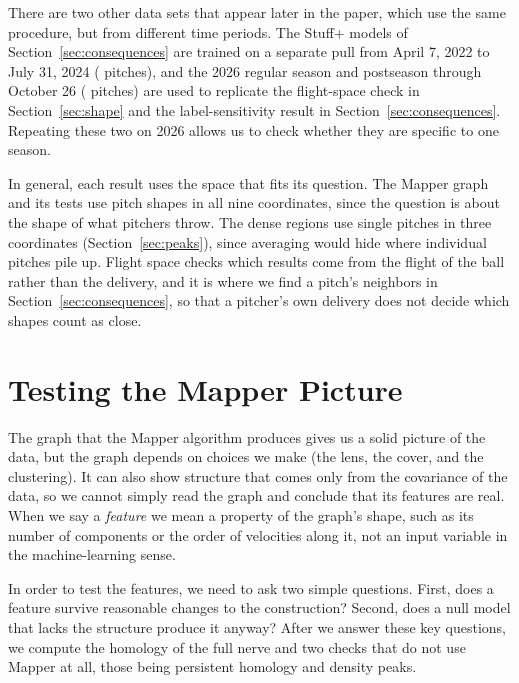 \documentclass[11pt]{article}
\theoremstyle{definition}
\theoremstyle{remark}
\begin{document}
There are two other data sets that appear later in the paper, which use the same procedure, but from different time periods. The Stuff+ models of Section~\ref{sec:consequences} are trained on a separate pull from April 7, 2022 to July 31, 2024 (\StuffTrainN{} pitches), and the 2026 regular season and postseason through October 26 (\NPitchesTwentySix{} pitches) are used to replicate the flight-space check in Section~\ref{sec:shape} and the label-sensitivity result in Section~\ref{sec:consequences}.
Repeating these two on 2026 allows us to check whether they are specific to one season.

In general, each result uses the space that fits its question. The Mapper graph and its tests use pitch shapes in all nine coordinates, since the question is about the shape of what pitchers throw. The dense regions use single pitches in three coordinates (Section~\ref{sec:peaks}), since averaging would hide where individual pitches pile up. Flight space checks which results come from the flight of the ball rather than the delivery, and it is where we find a pitch's neighbors in Section~\ref{sec:consequences}, so that a pitcher's own delivery does not decide which shapes count as close.

\section{Testing the Mapper Picture}\label{sec:certify}
The graph that the Mapper algorithm produces gives us a solid picture of the data, but the graph depends on choices we make (the lens, the cover, and the clustering). It can also show structure that comes only from the covariance of the data, so we cannot simply read the graph and conclude that its features are real.
When we say a \emph{feature} we mean a property of the graph's shape, such as its number of components or the order of velocities along it, not an input variable in the machine-learning sense.

In order to test the features, we need to ask two simple questions. First, does a feature survive reasonable changes to the construction? Second, does a null model that lacks the structure produce it anyway?
After we answer these key questions, we compute the homology of the full nerve and two checks that do not use Mapper at all, those being persistent homology and density peaks.
\end{document}

